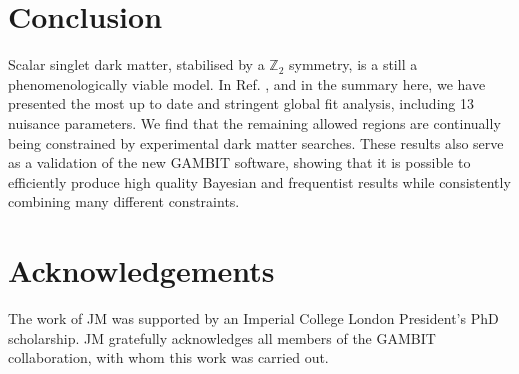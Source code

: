 \documentclass{PoS}
\newcommand{\GB}{\textsf{GAMBIT}\xspace}
\begin{document}
\section{Conclusion}

Scalar singlet dark matter, stabilised by a $\mathbb{Z}_2$ symmetry, is a still a phenomenologically viable model. In Ref. \cite{Athron:2017kgt}, and in the summary here, we have presented the most up to date and stringent global fit analysis, including 13 nuisance parameters.  We find that the remaining allowed regions are continually being constrained by experimental dark matter searches.  These results also serve as a validation of the new \GB software, showing that it is possible to efficiently produce high quality Bayesian and frequentist results while consistently combining many different constraints.

\section{Acknowledgements}
The work of JM was supported by an Imperial College London President's PhD scholarship.  JM gratefully acknowledges all members of the \GB collaboration, with whom this work was carried out.
\end{document}
